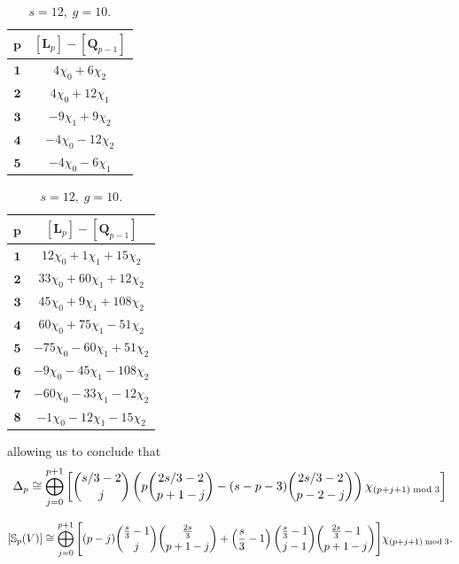 \documentclass[10pt]{amsart}
\theoremstyle{definition}
\begin{document}
\begin{table}[h]
\centering
\renewcommand{\arraystretch}{1.5}
\begin{minipage}[b]{0.45\textwidth}
\centering
\begin{tabular}{|c|c|}
\hline
$\mathbf{p}$ & $[\mathbf{L}_p]-[\mathbf{Q}_{p-1}]$ \\ \hline
$\mathbf{1}$ & $4\chi_0 + 6\chi_2$ \\ \hline
$\mathbf{2}$ & $4\chi_0 + 12\chi_1$ \\ \hline
$\mathbf{3}$ & $-9\chi_1 + 9\chi_2$ \\ \hline
$\mathbf{4}$ & $-4\chi_0 - 12\chi_2$ \\ \hline
$\mathbf{5}$ & $-4\chi_0 - 6\chi_1$ \\ \hline
\end{tabular}
\caption{$s=9,\;g=7$.}
\end{minipage}
\hspace{0.5cm}
\begin{minipage}[b]{0.45\textwidth}
\centering
\begin{tabular}{|c|c|}
\hline
$\mathbf{p}$ & $[\mathbf{L}_p]-[\mathbf{Q}_{p-1}]$ \\ \hline
$\mathbf{1}$ & $12\chi_0 + 1\chi_1 + 15\chi_2$ \\ \hline
$\mathbf{2}$ & $33\chi_0 + 60\chi_1 + 12\chi_2$ \\ \hline
$\mathbf{3}$ & $45\chi_0 + 9\chi_1 + 108\chi_2$ \\ \hline
$\mathbf{4}$ & $60\chi_0 + 75\chi_1 - 51\chi_2$ \\ \hline
$\mathbf{5}$ & $-75\chi_0 - 60\chi_1 + 51\chi_2$ \\ \hline
$\mathbf{6}$ & $-9\chi_0 - 45\chi_1 - 108\chi_2$ \\ \hline
$\mathbf{7}$ & $-60\chi_0 - 33\chi_1 - 12\chi_2$ \\ \hline
$\mathbf{8}$ & $-1\chi_0 - 12\chi_1 - 15\chi_2$ \\ \hline
\end{tabular}
\caption{$s=12,\;g=10$.}
\end{minipage}
\end{table}

 allowing us to conclude that
 \begin{equation*}
 \Delta_p \cong \bigoplus_{j=0}^{p+1} \left[ \binom{s/3-2}{j} \left( p \binom{2s/3-2}{p+1-j} - (s-p-3) \binom{2s/3-2}{p-2-j} \right) \chi_{(p+j+1) \;{\rm mod}\; 3} \right]
 \end{equation*}

\[
[\mathbb{S}_p(V)] \cong 
\bigoplus_{j=0}^{p+1} \Bigg[ 
(p-j) \binom{\frac{s}{3}-1}{j} \binom{\frac{2s}{3}}{p+1-j} 
+ \left(\frac{s}{3}-1\right) \binom{\frac{s}{3}-1}{j-1} \binom{\frac{2s}{3}-1}{p+1-j} 
\Bigg] \chi_{(p+j+1) \;{\rm mod}\; 3}.
\]



% 
%  
 
\end{document}
